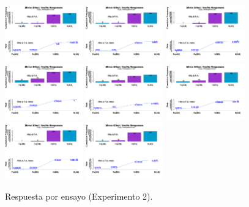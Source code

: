 \begin{figure}[th]
\includegraphics[width=0.30\textwidth]{Figures/MirrorRate_Exp2_P13} \includegraphics[width=0.30\textwidth]{Figures/MirrorRate_Exp2_P14} \includegraphics[width=0.30\textwidth]{Figures/MirrorRate_Exp2_P15}
\includegraphics[width=0.30\textwidth]{Figures/MirrorRate_Exp2_P16} \includegraphics[width=0.30\textwidth]{Figures/MirrorRate_Exp2_P17} \includegraphics[width=0.30\textwidth]{Figures/MirrorRate_Exp2_P18}
\includegraphics[width=0.30\textwidth]{Figures/MirrorRate_Exp2_P19} \includegraphics[width=0.30\textwidth]{Figures/MirrorRate_Exp2_P20} 
\caption[Response_Exp2]{Respuesta por ensayo (Experimento 2).}
\label{fig:Response_E2}
\end{figure}
